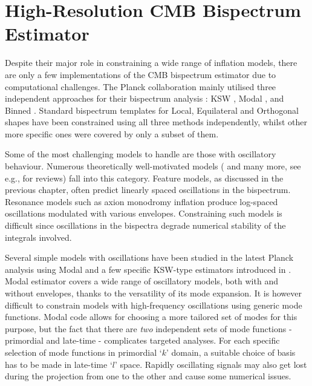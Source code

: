 \chapter{High-Resolution CMB Bispectrum Estimator} \label{chapter:high_resolution_cmb_bispectrum_estimator}

\ifpdf
    \graphicspath{{Chapter5/Figs/Raster/}{Chapter5/Figs/PDF/}{Chapter5/Figs/}}
\else
    \graphicspath{{Chapter5/Figs/Vector/}{Chapter5/Figs/}}
\fi

Despite their major role in constraining a wide range of inflation models, there are only a few implementations of the CMB bispectrum estimator due to computational challenges. The Planck collaboration mainly utilised three independent approaches for their bispectrum analysis \cite{PlanckCollaboration2013,PlanckCollaboration2015,PlanckCollaboration2018}: KSW \cite{Komatsu2005}, Modal \cite{Fergusson2012}, and Binned \cite{Bucher2010}. Standard bispectrum templates for Local, Equilateral and Orthogonal shapes have been constrained using all three methods independently, whilst other more specific ones were covered by only a subset of them.

Some of the most challenging models to handle are those with oscillatory behaviour. Numerous theoretically well-motivated models (\cite{Chen2010foldedResonant,Meerburg2009signatures,Meerburg2010nbd,Meerburg2011cutoff,Hazra2014} and many more, see e.g., \cite{Chen2010review,Chen2016} for reviews) fall into this category. Feature models, as discussed in the previous chapter, often predict linearly spaced oscillations in the bispectrum. Resonance models such as axion monodromy inflation \cite{Silverstein2008monodromy,Flauger2010monodromy} produce log-spaced oscillations modulated with various envelopes. Constraining such models is difficult since oscillations in the bispectra degrade numerical stability of the integrals involved.

Several simple models with oscillations have been studied in the latest Planck analysis using Modal and a few specific KSW-type estimators introduced in \cite{Munchmeyer2014}. Modal estimator covers a wide range of oscillatory models, both with and without envelopes, thanks to the versatility of its mode expansion. It is however difficult to constrain models with high-frequency oscillations using generic mode functions. Modal code allows for choosing a more tailored set of modes for this purpose, but the fact that there are \textit{two} independent sets of mode functions - primordial and late-time - complicates targeted analyses. For each specific selection of mode functions in primordial `$k$' domain, a suitable choice of basis has to be made in late-time `$l$' space. Rapidly oscillating signals may also get lost during the projection from one to the other and cause some numerical issues.

